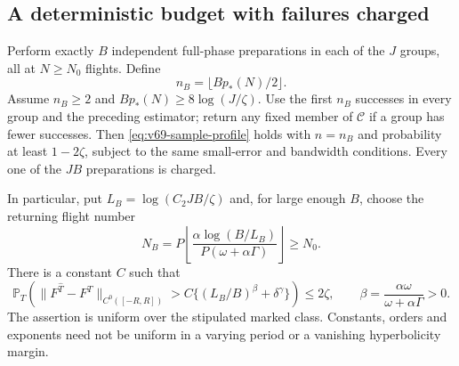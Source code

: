 \subsection{A deterministic budget with failures charged}

\begin{theorem}
\label{thm:v69-charged-recovery}
Perform exactly $B$ independent full-phase preparations in each of the
$J$ groups, all at $N\ge N_0$ flights.  Define
\[
 n_B=\lfloor Bp_*(N)/2\rfloor.
\]
Assume $n_B\ge2$ and $Bp_*(N)\ge8\log(J/\zeta)$.
Use the first $n_B$ successes in every group and the preceding estimator;
return any fixed member of $\mathscr C$ if a group has fewer successes.
Then \eqref{eq:v69-sample-profile} holds with $n=n_B$ and probability
at least $1-2\zeta$, subject to the same small-error and bandwidth
conditions.  Every one of the $JB$ preparations is charged.

In particular, put $L_B=\log(C_2JB/\zeta)$ and, for large enough $B$,
choose the returning flight number
\begin{equation}\label{eq:v69-balanced-length}
 N_B=P\left\lfloor
       \frac{\alpha\log(B/L_B)}{P(\omega+\alpha\Gamma)}
                              \right\rfloor\ge N_0.
\end{equation}
There is a constant $C$ such that
\begin{equation}\label{eq:v69-budget-rate}
 \mathbb P_T\!\left(
 \|F^{\widehat T}-F^T\|_{C^0([-R,R])}>
 C\{(L_B/B)^\beta+\delta^\gamma\}\right)\le2\zeta,
 \qquad
 \beta=\frac{\alpha\omega}{\omega+\alpha\Gamma}>0.
\end{equation}
The assertion is uniform over the stipulated marked class.  Constants,
orders and exponents need not be uniform in a varying period or a
vanishing hyperbolicity margin.
\end{theorem}
